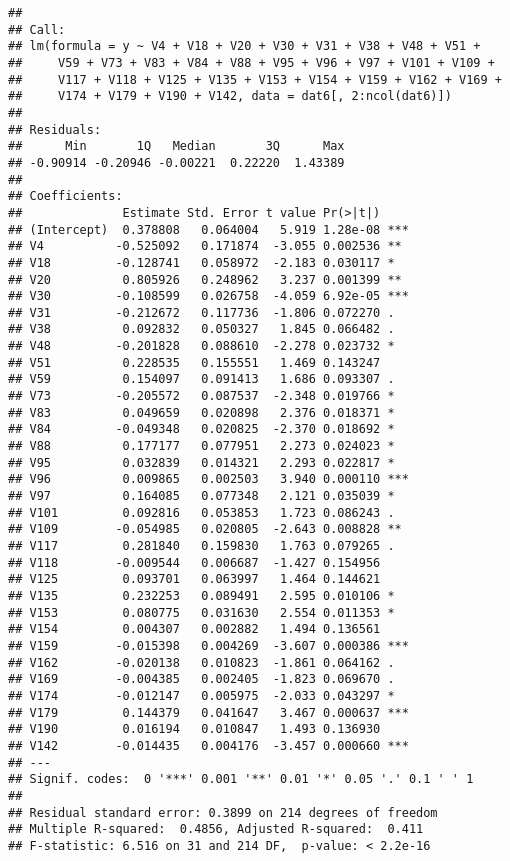 \documentclass[
]{article}
\begin{document}
\begin{verbatim}
## 
## Call:
## lm(formula = y ~ V4 + V18 + V20 + V30 + V31 + V38 + V48 + V51 + 
##     V59 + V73 + V83 + V84 + V88 + V95 + V96 + V97 + V101 + V109 + 
##     V117 + V118 + V125 + V135 + V153 + V154 + V159 + V162 + V169 + 
##     V174 + V179 + V190 + V142, data = dat6[, 2:ncol(dat6)])
## 
## Residuals:
##      Min       1Q   Median       3Q      Max 
## -0.90914 -0.20946 -0.00221  0.22220  1.43389 
## 
## Coefficients:
##              Estimate Std. Error t value Pr(>|t|)    
## (Intercept)  0.378808   0.064004   5.919 1.28e-08 ***
## V4          -0.525092   0.171874  -3.055 0.002536 ** 
## V18         -0.128741   0.058972  -2.183 0.030117 *  
## V20          0.805926   0.248962   3.237 0.001399 ** 
## V30         -0.108599   0.026758  -4.059 6.92e-05 ***
## V31         -0.212672   0.117736  -1.806 0.072270 .  
## V38          0.092832   0.050327   1.845 0.066482 .  
## V48         -0.201828   0.088610  -2.278 0.023732 *  
## V51          0.228535   0.155551   1.469 0.143247    
## V59          0.154097   0.091413   1.686 0.093307 .  
## V73         -0.205572   0.087537  -2.348 0.019766 *  
## V83          0.049659   0.020898   2.376 0.018371 *  
## V84         -0.049348   0.020825  -2.370 0.018692 *  
## V88          0.177177   0.077951   2.273 0.024023 *  
## V95          0.032839   0.014321   2.293 0.022817 *  
## V96          0.009865   0.002503   3.940 0.000110 ***
## V97          0.164085   0.077348   2.121 0.035039 *  
## V101         0.092816   0.053853   1.723 0.086243 .  
## V109        -0.054985   0.020805  -2.643 0.008828 ** 
## V117         0.281840   0.159830   1.763 0.079265 .  
## V118        -0.009544   0.006687  -1.427 0.154956    
## V125         0.093701   0.063997   1.464 0.144621    
## V135         0.232253   0.089491   2.595 0.010106 *  
## V153         0.080775   0.031630   2.554 0.011353 *  
## V154         0.004307   0.002882   1.494 0.136561    
## V159        -0.015398   0.004269  -3.607 0.000386 ***
## V162        -0.020138   0.010823  -1.861 0.064162 .  
## V169        -0.004385   0.002405  -1.823 0.069670 .  
## V174        -0.012147   0.005975  -2.033 0.043297 *  
## V179         0.144379   0.041647   3.467 0.000637 ***
## V190         0.016194   0.010847   1.493 0.136930    
## V142        -0.014435   0.004176  -3.457 0.000660 ***
## ---
## Signif. codes:  0 '***' 0.001 '**' 0.01 '*' 0.05 '.' 0.1 ' ' 1
## 
## Residual standard error: 0.3899 on 214 degrees of freedom
## Multiple R-squared:  0.4856, Adjusted R-squared:  0.411 
## F-statistic: 6.516 on 31 and 214 DF,  p-value: < 2.2e-16
\end{verbatim}
\end{document}
